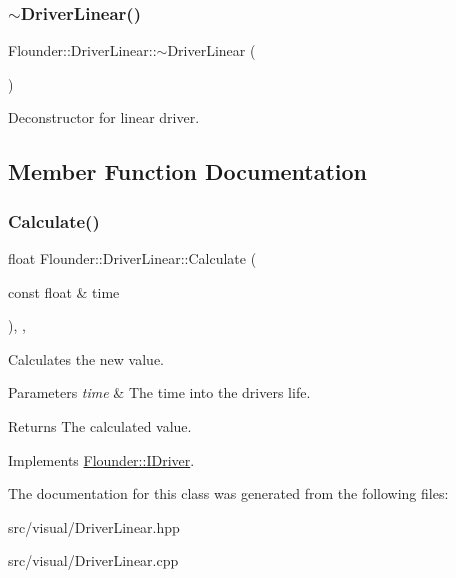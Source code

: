 \subsubsection{\texorpdfstring{$\sim$\+Driver\+Linear()}{~DriverLinear()}}
{\footnotesize\ttfamily Flounder\+::\+Driver\+Linear\+::$\sim$\+Driver\+Linear (\begin{DoxyParamCaption}{ }\end{DoxyParamCaption})}



Deconstructor for linear driver. 



\subsection{Member Function Documentation}
\mbox{\label{class_flounder_1_1_driver_linear_adbe67b982e8b7a819ec613a83617d83b}} 
\subsubsection{\texorpdfstring{Calculate()}{Calculate()}}
{\footnotesize\ttfamily float Flounder\+::\+Driver\+Linear\+::\+Calculate (\begin{DoxyParamCaption}\item[{const float \&}]{time }\end{DoxyParamCaption})\hspace{0.3cm}{\ttfamily [override]}, {\ttfamily [protected]}, {\ttfamily [virtual]}}



Calculates the new value. 


\begin{DoxyParams}{Parameters}
{\em time} & The time into the drivers life. \\
\hline
\end{DoxyParams}
\begin{DoxyReturn}{Returns}
The calculated value. 
\end{DoxyReturn}


Implements \hyperlink{class_flounder_1_1_i_driver_a969f0c8da089f9d17129ee12b40c354a}{Flounder\+::\+I\+Driver}.



The documentation for this class was generated from the following files\+:\begin{DoxyCompactItemize}
\item 
src/visual/Driver\+Linear.\+hpp\item 
src/visual/Driver\+Linear.\+cpp\end{DoxyCompactItemize}
